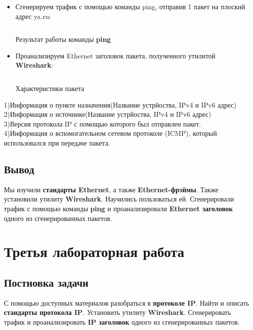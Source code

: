 \begin{itemize}
    \item Сгенерируем трафик с помощью команды ping, отправив 1 пакет на плоский адрес ya.ru:
\begin{code}
	\inputminted[breaklines=true, xleftmargin=1em, linenos, frame=single, framesep=10pt, fontsize=\footnotesize, firstline=1, lastline=33]{haskell}{fig/ping.bash}
	\caption{Результат работы команды \textbf{ping}}
\end{code}

    \item Проанализируем Ethernet заголовок пакета, полученного утилитой \textbf{Wireshark}:

\begin{code}
	\inputminted[breaklines=true, xleftmargin=1em, linenos, frame=single, framesep=10pt, fontsize=\footnotesize, firstline=1, lastline=33]{haskell}{fig/packet.bash}
	\caption{Характеристики пакета}
\end{code}

\end{itemize}

\newpage

1)Информация о пункте назначения(Название устрйоства, IPv4 и IPv6 адрес)\\
2)Информация о источнике(Название устрйоства, IPv4 и IPv6 адрес)\\
3)Версия протокола IP с помощью которого был отправлен пакет.\\
4)Информация о вспомогательном сетевом протоколе (ICMP), который использовался при передаче пакета.

\subsection{Вывод}
Мы изучили \textbf{стандарты Ethernet}, а также \textbf{Ethernet-фрэймы}. Также установили утилиту \textbf{Wireshark}. Научились пользоваться ей. Сгенерировали трафик с помощью команды \textbf{ping} и проанализировали \textbf{Ethernet заголовок} одного из сгенерированных пакетов.

\newpage

\section{Третья лабораторная работа}

\subsection{Постновка задачи}
С помощью доступных материалов разобраться в \textbf{протоколе IP}. Найти и описать
\textbf{стандарты протокола IP}. Установить утилиту \textbf{Wireshark}. Сгенерировать трафик и проанализировать \textbf{IP заголовок} одного из сгенерированных пакетов.


